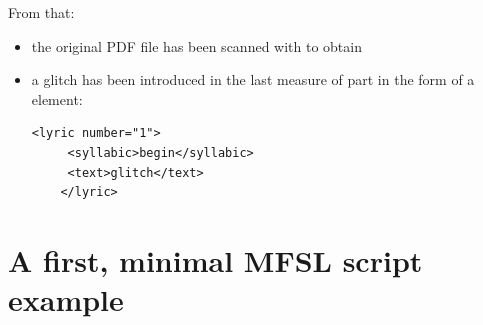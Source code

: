 From that:
\begin{itemize}
\item the original PDF file has been scanned with  to obtain\\

\item a glitch has been introduced in the last measure of part  in the form of a  element:
\begin{lstlisting}[language=MusicXML]
    <lyric number="1">
     <syllabic>begin</syllabic>
     <text>glitch</text>
    </lyric>
\end{lstlisting}
\end{itemize}


\section{A first, minimal MFSL script example}

